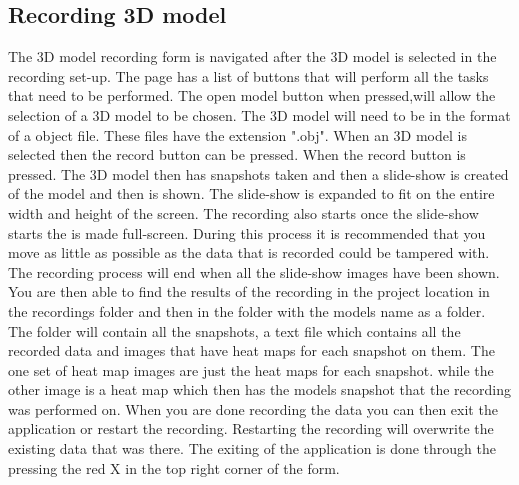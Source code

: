 \subsection{Recording 3D model}
The 3D model recording form is navigated after the 3D model is selected in the recording set-up. The page has a list of buttons that will perform all the tasks that need to be performed. The open model button when pressed,will allow the selection of a 3D model to be chosen. The 3D model will need to be in the format of a object file. These files have the extension ".obj". When an 3D model is selected then the record button can be pressed. When the record button is pressed. The 3D model then has snapshots taken and then a slide-show is created of the model and then is shown. The slide-show is expanded to fit on the entire width and height of the screen. The recording also starts once the slide-show starts the is made full-screen. During this process it is recommended that you move as little as possible as the data that is recorded could be tampered with. The recording process will end when all the slide-show images have been shown. You are then able to find the results of the recording in the project location in the recordings folder and then in the folder with the models name as a folder. The folder will contain all the snapshots, a text file which contains all the recorded data and images that have heat maps for each snapshot on them. The one set of heat map images are just the heat maps for each snapshot. while the other image is a heat map which then has the models snapshot that the recording was performed on. When you are done recording the data you can then exit the application or restart the recording. Restarting the recording will overwrite the existing data that was there. The exiting of the application is done through the pressing the red X in the top right corner of the form.

